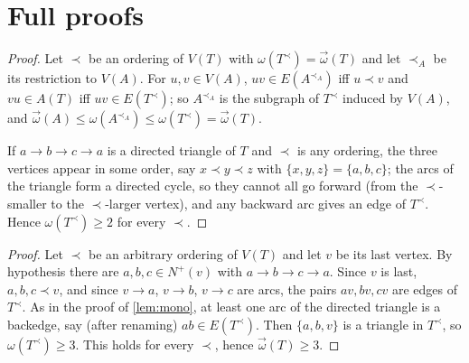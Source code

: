 \documentclass[11pt,a4paper]{article}
\theoremstyle{plain}
\theoremstyle{definition}
\theoremstyle{remark}
\newcommand{\cl}{\overrightarrow{\omega}}
\begin{document}
\appendix

\section{Full proofs}\label{app:proofs}

\label{pf:mono}
\lemmono*
\begin{proof}
Let $\prec$ be an ordering of $V(T)$ with $\omega(T^\prec)=\cl(T)$ and let $\prec_A$ be its restriction to $V(A)$. For $u,v\in V(A)$, $uv\in E(A^{\prec_A})$ iff $u\prec v$ and $vu\in A(T)$ iff $uv\in E(T^\prec)$; so $A^{\prec_A}$ is the subgraph of $T^\prec$ induced by $V(A)$, and $\cl(A)\le\omega(A^{\prec_A})\le\omega(T^\prec)=\cl(T)$.

If $a\to b\to c\to a$ is a directed triangle of $T$ and $\prec$ is any ordering, the three vertices appear in some order, say $x\prec y\prec z$ with $\{x,y,z\}=\{a,b,c\}$; the arcs of the triangle form a directed cycle, so they cannot all go forward (from the $\prec$-smaller to the $\prec$-larger vertex), and any backward arc gives an edge of $T^\prec$. Hence $\omega(T^\prec)\ge2$ for every $\prec$.
\end{proof}

\label{pf:last}
\lemlast*
\begin{proof}
Let $\prec$ be an arbitrary ordering of $V(T)$ and let $v$ be its last vertex. By hypothesis there are $a,b,c\in N^+(v)$ with $a\to b\to c\to a$. Since $v$ is last, $a,b,c\prec v$, and since $v\to a$, $v\to b$, $v\to c$ are arcs, the pairs $av,bv,cv$ are edges of $T^\prec$. As in the proof of \cref{lem:mono}, at least one arc of the directed triangle is a backedge, say (after renaming) $ab\in E(T^\prec)$. Then $\{a,b,v\}$ is a triangle in $T^\prec$, so $\omega(T^\prec)\ge3$. This holds for every $\prec$, hence $\cl(T)\ge3$.
\end{proof}
\end{document}
